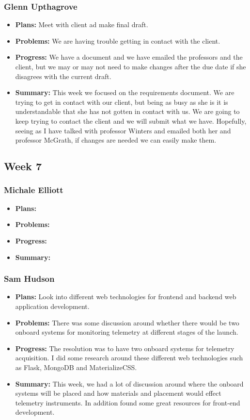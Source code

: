 \documentclass[onecolumn, draftclsnofoot,10pt, compsoc]{IEEEtran}
\begin{document}
\subsubsection{Glenn Upthagrove}
\begin {itemize}
 \item \textbf{Plans: }Meet with client ad make final draft. 
 \item \textbf{Problems: }We are having trouble getting in contact with the client.
 \item \textbf{Progress: }We have a document and we have emailed the professors and the client, but we may or may not need to make changes after the due date if she disagrees with the current draft.
 \item \textbf{Summary: }This week we focused on the requirements document. We are trying to get in contact with our client, but being as busy as she is it is understandable that she has not gotten in contact with us. We are going to keep trying to contact the client and we will submit what we have. Hopefully, seeing as I have talked with professor Winters and emailed both her and professor McGrath, if changes are needed we can easily make them.  
\end {itemize}
\subsection {Week 7}
\subsubsection{Michale Elliott}
\begin {itemize}
 \item \textbf{Plans: }
 \item \textbf{Problems: }
 \item \textbf{Progress: }
 \item \textbf{Summary: }
\end {itemize}
\subsubsection{Sam Hudson}
\begin {itemize}
\item \textbf{Plans: }Look into different web technologies for frontend and backend web application development.
\item \textbf{Problems: }There was some discussion around whether there would be two onboard systems for monitoring telemetry at different stages of the launch.
\item \textbf{Progress: } The resolution was to have two onboard systems for telemetry acquisition. I did some research around these different web technologies such as Flask, MongoDB and MaterializeCSS.
\item \textbf{Summary: }This week, we had a lot of discussion around where the onboard systems will be placed and how materials and placement would effect telemetry instruments. In addition found some great resources for front-end development.
\end {itemize}
\end{document}
